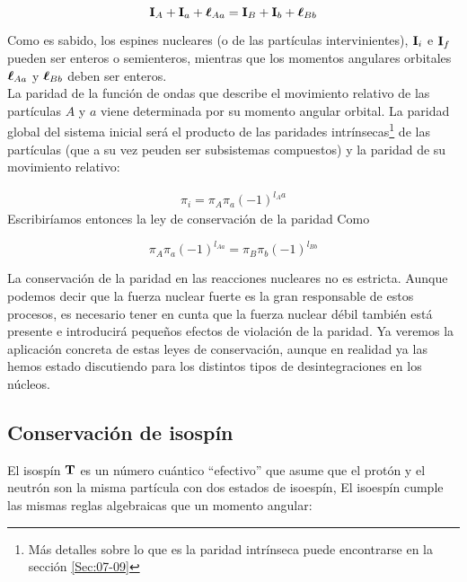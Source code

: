 \begin{mybox}
\begin{equation}
    \mathbf{I}_A + \mathbf{I}_a + \boldsymbol{\ell}_{Aa} = \mathbf{I}_B + \mathbf{I}_b + \boldsymbol{\ell}_{Bb} 
\end{equation}
\end{mybox}
Como es sabido, los espines nucleares (o de las partículas intervinientes), $\mathbf{I}_i$ e $\mathbf{I}_f$ pueden ser enteros o semienteros, mientras que los momentos angulares orbitales $\boldsymbol{\ell}_{Aa}$ y $\boldsymbol{\ell}_{Bb}$ deben ser enteros. \\


La paridad de la función de ondas que describe el movimiento relativo de las partículas $A$ y $a$ viene determinada por su momento angular orbital. La paridad global del sistema inicial será el producto de las paridades intrínsecas\footnote{Más detalles sobre lo que es la paridad intrínseca puede encontrarse en la sección \ref{Sec:07-09}} de las partículas (que a su vez peuden ser subsistemas compuestos) y la paridad de su movimiento relativo:

\begin{eqnarray}
    \pi_i = \pi_A \pi_a (-1)^{l_Aa}
\end{eqnarray}
Escribiríamos entonces la ley de conservación de la paridad Como

\begin{mybox}
\begin{equation}
    \pi_A \pi_a (-1)^{l_{Aa}} = \pi_B \pi_b (-1)^{l_{Bb}}
\end{equation}
\end{mybox}

La conservación de la paridad en las reacciones nucleares no es estricta. Aunque podemos decir que la fuerza nuclear fuerte es la gran responsable de estos procesos, es necesario tener en cunta que la fuerza nuclear débil también está presente e introducirá pequeños efectos de violación de la paridad. Ya veremos la aplicación concreta de estas leyes de conservación, aunque en realidad ya las hemos estado discutiendo para los distintos tipos de desintegraciones en los núcleos.

\subsection{Conservación de isospín}

El isospín $\mathbf{T}$ es un número cuántico ``efectivo'' que asume que el protón y el neutrón son la misma partícula con dos estados de isoespín, El isoespín cumple las mismas reglas algebraicas que un momento angular:

